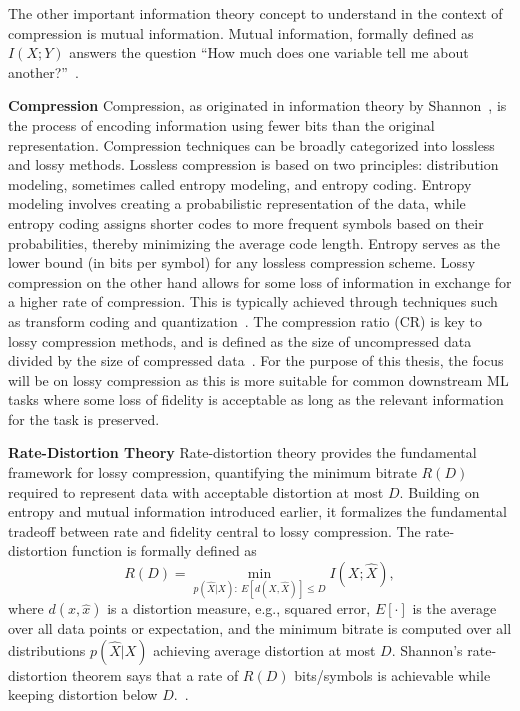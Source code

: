 The other important information theory concept to understand in the context of compression is mutual information. Mutual information, formally defined as $I(X;Y)$ answers the question ``How much does one variable tell me about another?''~\cite{Shannon1948}.

\textbf{Compression} Compression, as originated in information theory by Shannon~\cite{Shannon1948}, is the process of encoding information using fewer bits than the original representation. Compression techniques can be broadly categorized into lossless and lossy methods. Lossless compression is based on two principles: distribution modeling, sometimes called entropy modeling, and entropy coding. Entropy modeling involves creating a probabilistic representation of the data, while entropy coding assigns shorter codes to more frequent symbols based on their probabilities, thereby minimizing the average code length. Entropy serves as the lower bound (in bits per symbol) for any lossless compression scheme. Lossy compression on the other hand allows for some loss of information in exchange for a higher rate of compression. This is typically achieved through techniques such as transform coding and quantization~\cite{Sayood2017}. The compression ratio (CR) is key to lossy compression methods, and is defined as the size of uncompressed data divided by the size of compressed data~\cite{Thomasian2022}. For the purpose of this thesis, the focus will be on lossy compression as this is more suitable for common downstream ML tasks where some loss of fidelity is acceptable as long as the relevant information for the task is preserved.

\textbf{Rate-Distortion Theory} Rate-distortion theory provides the fundamental framework for lossy compression, quantifying the minimum bitrate $R(D)$ required to represent data with acceptable distortion at most $D$. Building on entropy and mutual information introduced earlier, it formalizes the fundamental tradeoff between rate and fidelity central to lossy compression. The rate-distortion function is formally defined as
\begin{equation}
R(D) = \min_{p(\hat{X}|X):\ E[d(X,\hat{X})] \leq D} I(X;\hat{X}),
\end{equation}
where $d(x,\hat{x})$ is a distortion measure, e.g., squared error, $E[\cdot]$ is the average over all data points or expectation, and the minimum bitrate is computed over all distributions $p(\hat{X}|X)$ achieving average distortion at most $D$. Shannon's rate-distortion theorem says that a rate of $R(D)$ bits/symbols is achievable while keeping distortion below $D$.~\cite{Shannon1949}.

